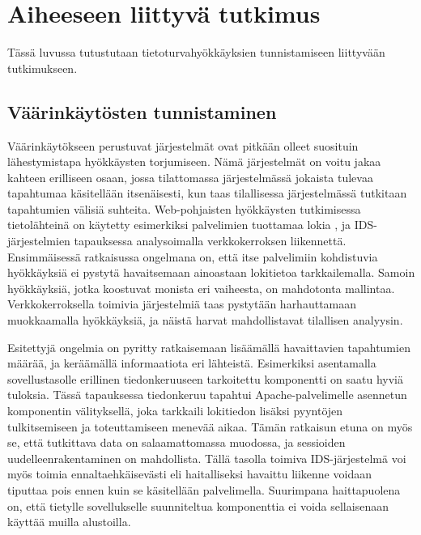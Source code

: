 
\chapter{Aiheeseen liittyvä tutkimus}

Tässä luvussa tutustutaan tietoturvahyökkäyksien tunnistamiseen liittyvään tutkimukseen.

\section{Väärinkäytösten tunnistaminen}

Väärinkäytökseen perustuvat järjestelmät ovat pitkään olleet suosituin lähestymistapa hyökkäysten torjumiseen. Nämä järjestelmät on voitu jakaa kahteen erilliseen osaan, jossa tilattomassa 
järjestelmässä jokaista tulevaa tapahtumaa käsitellään itsenäisesti, kun taas tilallisessa järjestelmässä tutkitaan tapahtumien välisiä suhteita. Web-pohjaisten hyökkäysten tutkimisessa tietolähteinä 
on käytetty esimerkiksi palvelimien tuottamaa lokia \cite{LightTool}, ja IDS-järjestelmien \cite{Snort}\cite{Bro} tapauksessa analysoimalla verkkokerroksen liikennettä. Ensimmäisessä ratkaisussa ongelmana
on, että itse palvelimiin kohdistuvia hyökkäyksiä ei pystytä havaitsemaan ainoastaan lokitietoa tarkkailemalla. Samoin hyökkäyksiä, jotka koostuvat monista eri vaiheesta, on mahdotonta mallintaa. 
Verkkokerroksella toimivia järjestelmiä taas pystytään harhauttamaan muokkaamalla hyökkäyksiä, ja näistä harvat mahdollistavat tilallisen analyysin. 

Esitettyjä ongelmia on pyritty ratkaisemaan lisäämällä havaittavien tapahtumien määrää, ja keräämällä informaatiota eri lähteistä. Esimerkiksi asentamalla sovellustasolle erillinen tiedonkeruuseen 
tarkoitettu komponentti \cite{Application} on saatu hyviä tuloksia. Tässä tapauksessa tiedonkeruu tapahtui Apache-palvelimelle asennetun komponentin välityksellä, joka tarkkaili lokitiedon lisäksi
pyyntöjen tulkitsemiseen ja toteuttamiseen menevää aikaa. Tämän ratkaisun etuna on myös se, että tutkittava data on salaamattomassa muodossa, ja sessioiden uudelleenrakentaminen on mahdollista. 
Tällä tasolla toimiva IDS-järjestelmä voi myös toimia ennaltaehkäisevästi eli haitalliseksi havaittu liikenne voidaan tiputtaa pois ennen kuin se käsitellään palvelimella. Suurimpana haittapuolena on, 
että tietylle sovellukselle suunniteltua komponenttia ei voida sellaisenaan käyttää muilla alustoilla. 

